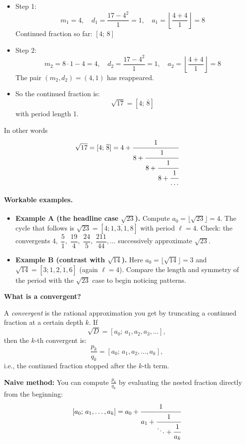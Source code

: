 \documentclass[11pt]{article}
\begin{document}
\begin{itemize}
  \item Step 1:
  \[
  m_1 = 4, \quad d_1 = \frac{17 - 4^2}{1} = 1, \quad a_1 = \left\lfloor \frac{4 + 4}{1} \right\rfloor = 8
  \]
  Continued fraction so far: \( [4;\,8] \)

  \item Step 2:
  \[
  m_2 = 8 \cdot 1 - 4 = 4, \quad d_2 = \frac{17 - 4^2}{1} = 1, \quad a_2 = \left\lfloor \frac{4 + 4}{1} \right\rfloor = 8
  \]
  The pair \( (m_2, d_2) = (4, 1) \) has reappeared.

  \item So the continued fraction is:
  \[
  \sqrt{17} = [4;\, \overline{8}]
  \]
  with period length 1.
\end{itemize}
\smallskip
\noindent
In other words
\[
\sqrt{17} = [4;\, \overline{8}] = 4 + \cfrac{1}{8 + \cfrac{1}{8 + \cfrac{1}{8 + \cfrac{1}{\dots}}}}
\]

\paragraph{Workable examples.}
\begin{itemize}
  \item \textbf{Example A (the headline case $\sqrt{23}$).} Compute $a_0=\lfloor \sqrt{23}\rfloor=4$. The cycle that follows is
  $\sqrt{23}=[4;\overline{1,3,1,8}]$ with period $\ell=4$. Check: the convergents $4,\; \dfrac{5}{1},\;\dfrac{19}{4},\;\dfrac{24}{5},\;\dfrac{211}{44},\dots$ successively approximate $\sqrt{23}$.
  \item \textbf{Example B (contrast with $\sqrt{14}$).} Here $a_0=\lfloor\sqrt{14}\rfloor=3$ and
  $\sqrt{14}=[3;\overline{1,2,1,6}]$ (again $\ell=4$). Compare the length and symmetry of the period with the $\sqrt{23}$ case to begin noticing patterns.
\end{itemize}

\smallskip
\noindent
\textbf{What is a convergent?}

A \emph{convergent} is the rational approximation you get by truncating a continued fraction at a certain depth \( k \). If
\[
\sqrt{D} = [a_0;\, a_1, a_2, a_3, \dots],
\]
then the \( k \)-th convergent is:
\[
\frac{p_k}{q_k} = [a_0;\, a_1, a_2, \dots, a_k],
\]
i.e., the continued fraction stopped after the \( k \)-th term.

\smallskip
\textbf{Naive method:} You can compute \( \frac{p_k}{q_k} \) by evaluating the nested fraction directly from the beginning:
\[
[a_0;\, a_1, \dots, a_k] = a_0 + \cfrac{1}{a_1 + \cfrac{1}{\ddots + \cfrac{1}{a_k}}}
\]
\end{document}
